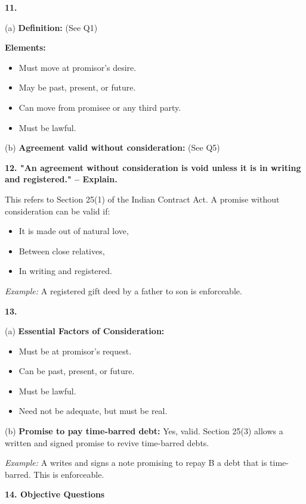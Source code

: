 \documentclass[12pt,a4paper]{book}
\begin{document}
\vspace{0.5cm}
\textbf{11.}

(a) \textbf{Definition:} (See Q1)

\textbf{Elements:}
\begin{itemize}
    \item Must move at promisor’s desire.
    \item May be past, present, or future.
    \item Can move from promisee or any third party.
    \item Must be lawful.
\end{itemize}

(b) \textbf{Agreement valid without consideration:} (See Q5)

\vspace{0.5cm}
\textbf{12. "An agreement without consideration is void unless it is in writing and registered." – Explain.}

This refers to Section 25(1) of the Indian Contract Act. A promise without consideration can be valid if:
\begin{itemize}
    \item It is made out of natural love,
    \item Between close relatives,
    \item In writing and registered.
\end{itemize}

\textit{Example:} A registered gift deed by a father to son is enforceable.

\vspace{0.5cm}
\textbf{13.}

(a) \textbf{Essential Factors of Consideration:}
\begin{itemize}
    \item Must be at promisor’s request.
    \item Can be past, present, or future.
    \item Must be lawful.
    \item Need not be adequate, but must be real.
\end{itemize}

(b) \textbf{Promise to pay time-barred debt:}  
Yes, valid. Section 25(3) allows a written and signed promise to revive time-barred debts.

\textit{Example:} A writes and signs a note promising to repay B a debt that is time-barred. This is enforceable.

\vspace{0.5cm}
\textbf{14. Objective Questions}
\end{document}
